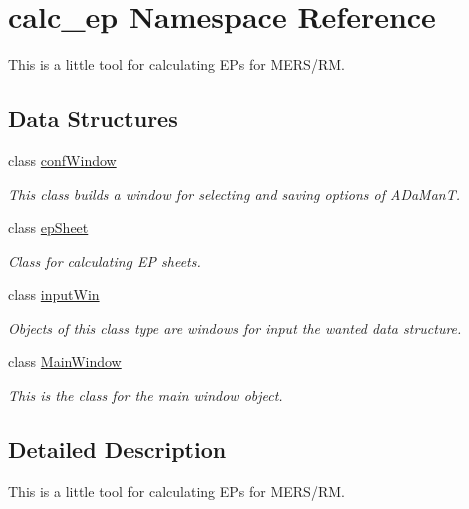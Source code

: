 \hypertarget{namespacecalc__ep}{}\section{calc\+\_\+ep Namespace Reference}
\label{namespacecalc__ep}


This is a little tool for calculating E\+Ps for M\+E\+R\+S/\+RM.  


\subsection*{Data Structures}
\begin{DoxyCompactItemize}
\item 
class \hyperlink{classcalc__ep_1_1confWindow}{conf\+Window}
\begin{DoxyCompactList}\small\item\em This class builds a window for selecting and saving options of A\+Da\+ManT. \end{DoxyCompactList}\item 
class \hyperlink{classcalc__ep_1_1epSheet}{ep\+Sheet}
\begin{DoxyCompactList}\small\item\em Class for calculating EP sheets. \end{DoxyCompactList}\item 
class \hyperlink{classcalc__ep_1_1inputWin}{input\+Win}
\begin{DoxyCompactList}\small\item\em Objects of this class type are windows for input the wanted data structure. \end{DoxyCompactList}\item 
class \hyperlink{classcalc__ep_1_1MainWindow}{Main\+Window}
\begin{DoxyCompactList}\small\item\em This is the class for the main window object. \end{DoxyCompactList}\end{DoxyCompactItemize}


\subsection{Detailed Description}
This is a little tool for calculating E\+Ps for M\+E\+R\+S/\+RM. 

